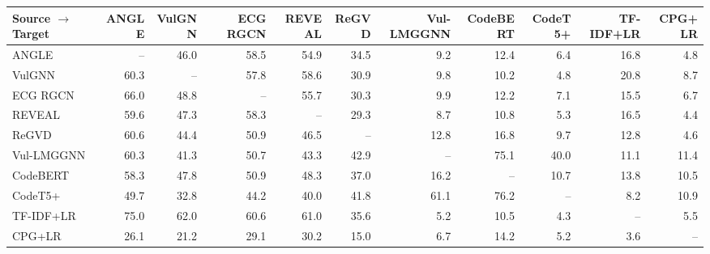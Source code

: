 \begin{tabular}{lrrrrrrrrrr}
\toprule
Source $\rightarrow$ Target & ANGLE & VulGNN & ECG RGCN & REVEAL & ReGVD & Vul-LMGGNN & CodeBERT & CodeT5+ & TF-IDF+LR & CPG+LR \\
\midrule
ANGLE & -- & 46.0 & 58.5 & 54.9 & 34.5 & 9.2 & 12.4 & 6.4 & 16.8 & 4.8 \\
VulGNN & 60.3 & -- & 57.8 & 58.6 & 30.9 & 9.8 & 10.2 & 4.8 & 20.8 & 8.7 \\
ECG RGCN & 66.0 & 48.8 & -- & 55.7 & 30.3 & 9.9 & 12.2 & 7.1 & 15.5 & 6.7 \\
REVEAL & 59.6 & 47.3 & 58.3 & -- & 29.3 & 8.7 & 10.8 & 5.3 & 16.5 & 4.4 \\
ReGVD & 60.6 & 44.4 & 50.9 & 46.5 & -- & 12.8 & 16.8 & 9.7 & 12.8 & 4.6 \\
Vul-LMGGNN & 60.3 & 41.3 & 50.7 & 43.3 & 42.9 & -- & 75.1 & 40.0 & 11.1 & 11.4 \\
CodeBERT & 58.3 & 47.8 & 50.9 & 48.3 & 37.0 & 16.2 & -- & 10.7 & 13.8 & 10.5 \\
CodeT5+ & 49.7 & 32.8 & 44.2 & 40.0 & 41.8 & 61.1 & 76.2 & -- & 8.2 & 10.9 \\
TF-IDF+LR & 75.0 & 62.0 & 60.6 & 61.0 & 35.6 & 5.2 & 10.5 & 4.3 & -- & 5.5 \\
CPG+LR & 26.1 & 21.2 & 29.1 & 30.2 & 15.0 & 6.7 & 14.2 & 5.2 & 3.6 & -- \\
\bottomrule
\end{tabular}
